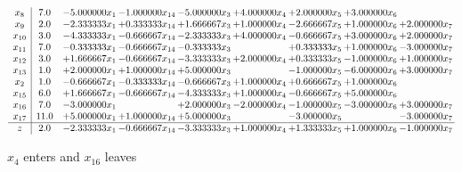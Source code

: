 \documentclass[10pt]{article}
\begin{document}
 \[\begin{array}{c| c c@{\hskip 2pt} c@{\hskip 2pt} c@{\hskip 2pt} c@{\hskip 2pt} c@{\hskip 2pt} c@{\hskip 2pt} c@{\hskip 2pt} }
 x_{8}   &  7.0 & -5.000000 x_{1} & -1.000000 x_{14} & -5.000000 x_{3} & + 4.000000 x_{4} & + 2.000000 x_{5} & + 3.000000 x_{6} &   \\
 x_{9}   &  2.0 & -2.333333 x_{1} & + 0.333333 x_{14} & + 1.666667 x_{3} & + 1.000000 x_{4} & -2.666667 x_{5} & + 1.000000 x_{6} & + 2.000000 x_{7}\\
 x_{10}   &  3.0 & -4.333333 x_{1} & -0.666667 x_{14} & -2.333333 x_{3} & + 4.000000 x_{4} & -0.666667 x_{5} & + 3.000000 x_{6} & + 2.000000 x_{7}\\
 x_{11}   &  7.0 & -0.333333 x_{1} & -0.666667 x_{14} & -0.333333 x_{3} &   & + 0.333333 x_{5} & + 1.000000 x_{6} & -3.000000 x_{7}\\
 x_{12}   &  3.0 & + 1.666667 x_{1} & -0.666667 x_{14} & -3.333333 x_{3} & + 2.000000 x_{4} & + 0.333333 x_{5} & -1.000000 x_{6} & + 1.000000 x_{7}\\
 x_{13}   &  1.0 & + 2.000000 x_{1} & + 1.000000 x_{14} & + 5.000000 x_{3} &   & -1.000000 x_{5} & -6.000000 x_{6} & + 3.000000 x_{7}\\
 x_{2}   &  1.0 & -0.666667 x_{1} & -0.333333 x_{14} & -0.666667 x_{3} & + 1.000000 x_{4} & + 0.666667 x_{5} & + 1.000000 x_{6} &   \\
 x_{15}   &  6.0 & + 1.666667 x_{1} & -0.666667 x_{14} & -4.333333 x_{3} & + 1.000000 x_{4} & -0.666667 x_{5} & + 5.000000 x_{6} &   \\
 x_{16}   &  7.0 & -3.000000 x_{1} &   & + 2.000000 x_{3} & -2.000000 x_{4} & -1.000000 x_{5} & -3.000000 x_{6} & + 3.000000 x_{7}\\
 x_{17}   &  11.0 & + 5.000000 x_{1} & + 1.000000 x_{14} & + 5.000000 x_{3} &   & -3.000000 x_{5} &   & -3.000000 x_{7}\\
\hline
z    &  2.0 & -2.333333 x_{1} & -0.666667 x_{14} & -3.333333 x_{3} & + 1.000000 x_{4} & + 1.333333 x_{5} & + 1.000000 x_{6} & -1.000000 x_{7}\\
\end{array}\]


 $ x_{4} $ enters and $ x_{16} $ leaves 
\end{document}
